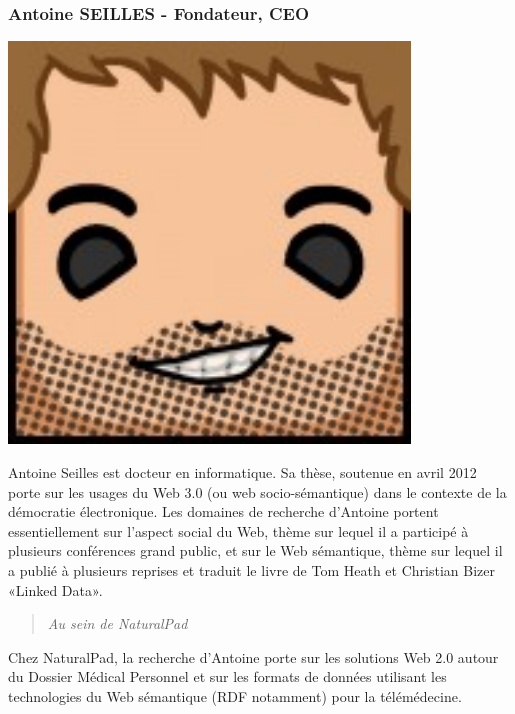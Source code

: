 		\subsubsection*{Antoine SEILLES - Fondateur, CEO}
\begin{minipage}[t!]{0.2\linewidth}
\centering
\includegraphics[width=0.8\textwidth]{images/tetocarre/antoine}
\end{minipage}
\begin{minipage}[t!]{0.79\linewidth}
Antoine Seilles est docteur en informatique. Sa thèse, soutenue en avril 2012 porte sur les usages du Web 3.0 (ou web socio-sémantique) dans le contexte de la démocratie électronique. Les domaines de recherche d’Antoine portent essentiellement sur l’aspect social du Web, thème sur lequel il a participé à plusieurs conférences grand public, et sur le Web sémantique, thème sur lequel il a publié à plusieurs reprises et traduit le livre de Tom Heath et Christian Bizer «Linked Data».
		\begin{quotation} \emph{Au sein de NaturalPad} \end{quotation}
Chez NaturalPad, la recherche d’Antoine porte sur les solutions Web 2.0 autour du Dossier Médical Personnel et sur les formats de données utilisant les technologies du Web sémantique (RDF notamment) pour la télémédecine.
\end{minipage}

